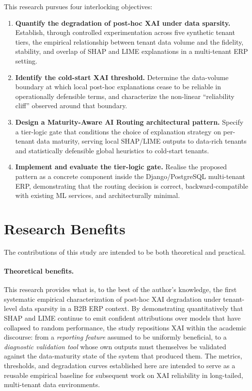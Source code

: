 This research pursues four interlocking objectives:

\begin{enumerate}
    \item \textbf{Quantify the degradation of post-hoc XAI under data sparsity.} Establish, through controlled experimentation across five synthetic tenant tiers, the empirical relationship between tenant data volume and the fidelity, stability, and overlap of SHAP and LIME explanations in a multi-tenant ERP setting.
    \item \textbf{Identify the cold-start XAI threshold.} Determine the data-volume boundary at which local post-hoc explanations cease to be reliable in operationally defensible terms, and characterize the non-linear ``reliability cliff'' observed around that boundary.
    \item \textbf{Design a Maturity-Aware AI Routing architectural pattern.} Specify a tier-logic gate that conditions the choice of explanation strategy on per-tenant data maturity, serving local SHAP/LIME outputs to data-rich tenants and statistically defensible global heuristics to cold-start tenants.
    \item \textbf{Implement and evaluate the tier-logic gate.} Realise the proposed pattern as a concrete component inside the Django/PostgreSQL multi-tenant ERP, demonstrating that the routing decision is correct, backward-compatible with existing ML services, and architecturally minimal.
\end{enumerate}

\section{Research Benefits}
\label{sec:research-benefits}

The contributions of this study are intended to be both theoretical and practical.

\paragraph{Theoretical benefits.}
This research provides what is, to the best of the author's knowledge, the first systematic empirical characterization of post-hoc XAI degradation under tenant-level data sparsity in a B2B ERP context. By demonstrating quantitatively that SHAP and LIME continue to emit confident attributions over models that have collapsed to random performance, the study repositions XAI within the academic discourse: from a \emph{reporting feature} assumed to be uniformly beneficial, to a \emph{diagnostic validation tool} whose own outputs must themselves be validated against the data-maturity state of the system that produced them. The metrics, thresholds, and degradation curves established here are intended to serve as a reusable empirical baseline for subsequent work on XAI reliability in long-tailed, multi-tenant data environments.

